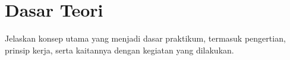 \section{Dasar Teori}

Jelaskan konsep utama yang menjadi dasar praktikum, termasuk pengertian,
prinsip kerja, serta kaitannya dengan kegiatan yang dilakukan.

%
